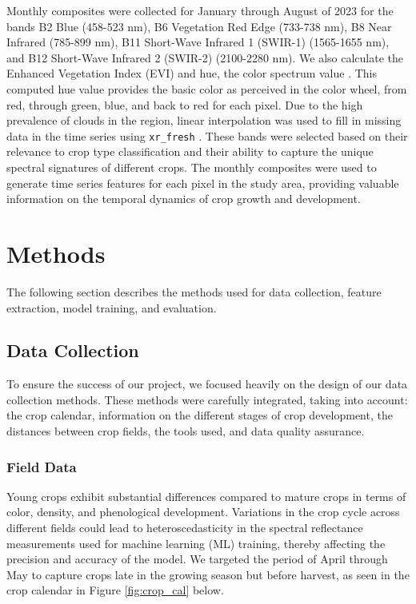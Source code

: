 \documentclass[
  journal,
  twocolumn]{IEEEtran}
\begin{document}
Monthly composites were collected for January through August of 2023 for
the bands B2 Blue (458-523 nm), B6 Vegetation Red Edge (733-738 nm), B8
Near Infrared (785-899 nm), B11 Short-Wave Infrared 1 (SWIR-1)
(1565-1655 nm), and B12 Short-Wave Infrared 2 (SWIR-2) (2100-2280 nm).
We also calculate the Enhanced Vegetation Index (EVI) and hue, the color
spectrum value \citep{GoogleHSV}. This computed hue value provides the
basic color as perceived in the color wheel, from red, through green,
blue, and back to red for each pixel. Due to the high prevalence of
clouds in the region, linear interpolation was used to fill in missing
data in the time series using \texttt{xr\_fresh} \citep{xr_fresh_2021}.
These bands were selected based on their relevance to crop type
classification and their ability to capture the unique spectral
signatures of different crops. The monthly composites were used to
generate time series features for each pixel in the study area,
providing valuable information on the temporal dynamics of crop growth
and development.

\section{Methods}\label{methods}

The following section describes the methods used for data collection,
feature extraction, model training, and evaluation.

\subsection{Data Collection}\label{data-collection}

To ensure the success of our project, we focused heavily on the design
of our data collection methods. These methods were carefully integrated,
taking into account: the crop calendar, information on the different
stages of crop development, the distances between crop fields, the tools
used, and data quality assurance.

\subsubsection{Field Data}\label{field-data}

Young crops exhibit substantial differences compared to mature crops in
terms of color, density, and phenological development. Variations in the
crop cycle across different fields could lead to heteroscedasticity in
the spectral reflectance measurements used for machine learning (ML)
training, thereby affecting the precision and accuracy of the model. We
targeted the period of April through May to capture crops late in the
growing season but before harvest, as seen in the crop calendar in
Figure \ref{fig:crop_cal} below.
\end{document}
